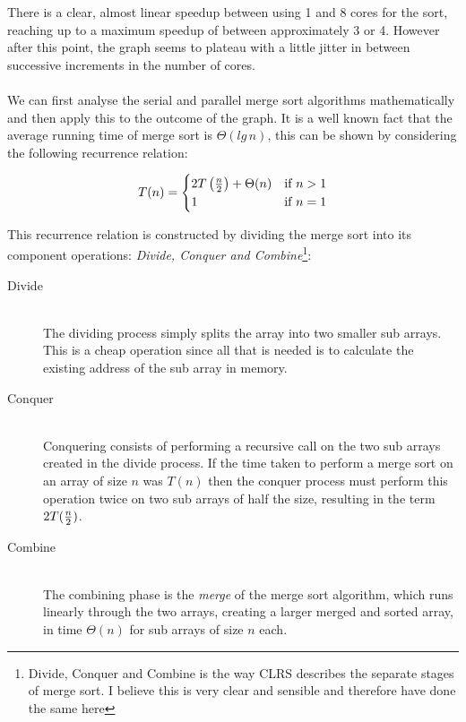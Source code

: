 \documentclass[12pt,twoside,notitlepage]{report}
\begin{document}
There is a clear, almost linear speedup between using 1 and 8 cores for the sort, reaching up to a maximum speedup of between approximately 3 or 4. However after this point, the graph seems to plateau with a little jitter in between
successive increments in the number of cores.
\hfill\\
\hfill\\
We can first analyse the serial and parallel merge sort algorithms mathematically and then apply this to the outcome of the graph. It is a well known fact that the average running time of merge sort is $\Theta(lg\,{n})$, this can be
shown by considering the following recurrence relation:

\[
T(n) = 
    \begin{cases}
    2T\left({n \over 2}\right) + \Theta(n) & \text{if } n > 1 \\
    1 & \text{if } n = 1
    \end{cases}
\]

This recurrence relation is constructed by dividing the merge sort into its component operations: {\em Divide, Conquer and Combine}\footnote{Divide, Conquer and Combine is the way CLRS describes the separate stages of merge sort. I
believe this is very clear and sensible and therefore have done the same here}:

\begin{description}

\item[Divide] \hfill \\
The dividing process simply splits the array into two smaller sub arrays. This is a cheap operation since all that is needed is to calculate the existing address of the sub array in memory.

\item[Conquer] \hfill \\
Conquering consists of performing a recursive call on the two sub arrays created in the divide process. If the time taken to perform a merge sort on an array of size $n$ was $T(n)$ then the conquer process must perform this operation
twice on two sub arrays of half the size, resulting in the term $2T({n \over 2})$.

\item[Combine] \hfill \\
The combining phase is the {\em merge} of the merge sort algorithm, which runs linearly through the two arrays, creating a larger merged and sorted array, in time $\Theta(n)$ for sub arrays of size $n$ each.

\end{description}
\end{document}
